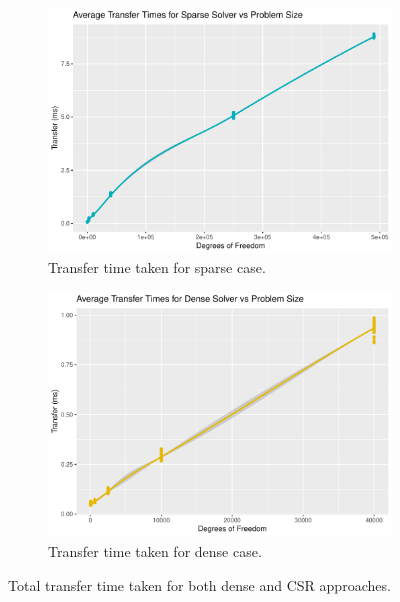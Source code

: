 \begin{figure}
	\centering
	\begin{subfigure}{0.48\linewidth}
		\centering
		\includegraphics[width = \linewidth]{Plots/transf_sparse_vs_n}
		\caption{Transfer time taken for sparse case.}
		\label{fig:transf_sparse}
	\end{subfigure}\hfill
	\begin{subfigure}{0.48\linewidth}
		\centering
		\includegraphics[width=\linewidth]{Plots/transf_dense_vs_n}
		\caption{Transfer time taken for dense case.}
		\label{fig:transf_dense}
	\end{subfigure}
	\caption{Total transfer time taken for both dense and CSR approaches.}
	\label{fig:transf}
\end{figure}

